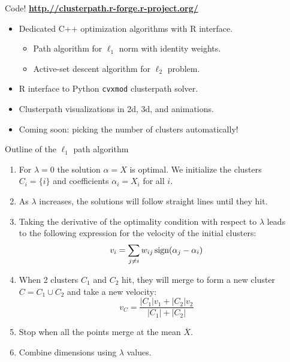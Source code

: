 \documentclass[final]{beamer}
\begin{document}
\begin{frame}{}
\begin{columns}[T]
\begin{column}{0.315\linewidth}
\end{column}\hfill
\begin{column}{0.315\linewidth}
\begin{alertblock}{Code!
    \textbf{\url{http.//clusterpath.r-forge.r-project.org/}}}
\begin{itemize}
\item Dedicated C++ optimization algorithms with R interface.
  \begin{itemize}
  \item Path algorithm for $\ell_1$ norm with identity weights.
  \item Active-set descent algorithm for $\ell_2$ problem.
  \end{itemize}
\item R interface to Python \texttt{cvxmod} clusterpath solver.
\item Clusterpath visualizations in 2d, 3d, and animations.
\item Coming soon: picking the number of clusters automatically!
\end{itemize}
\end{alertblock}


\begin{block}{Outline of the $\ell_1$ path algorithm}
\begin{enumerate}
\item For $\lambda=0$ the solution $\alpha=X$ is optimal. We
  initialize the clusters $C_i = \{i\}$ and coefficients $\alpha_i =
  X_i$ for all $i$.
\item As $\lambda$ increases, the solutions will follow straight
  lines until they hit.
\item Taking the derivative of the optimality condition with respect
  to $\lambda$ leads to the following expression for the velocity of
  the initial clusters:
$$v_i = \sum_{j\neq i}w_{ij}\operatorname{sign}(\alpha_j-\alpha_i)$$
\item When 2 clusters $C_1$ and $C_2$ hit, they will merge to form a
  new cluster $C = C_1\cup C_2$ and take a new velocity:
$$v_C = \frac{
|C_1|v_1 + |C_2|v_2
}{
|C_1|+|C_2|
}$$
\item Stop when all the points merge at the mean $\overline X$.
\item Combine dimensions using $\lambda$ values.
\end{enumerate}

\end{block}





\end{column}
\end{columns}
\end{frame}
\end{document}
